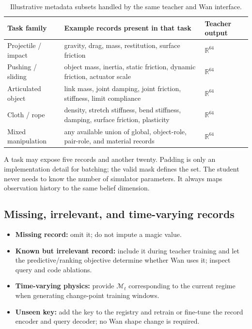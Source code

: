 \documentclass[11pt]{article}
\newcommand{\R}{\mathbb R}
\newcommand{\meta}{\mathcal M}
\begin{document}
\begin{table}[H]
\centering
\small
\caption{Illustrative metadata subsets handled by the same teacher and Wan interface.}
\begin{tabularx}{\textwidth}{L{0.18\textwidth} Y L{0.22\textwidth}}
\toprule
Task family & Example records present in that task & Teacher output \\
\midrule
Projectile / impact & gravity, drag, mass, restitution, surface friction & $\R^{64}$ \\
Pushing / sliding & object mass, inertia, static friction, dynamic friction, actuator scale & $\R^{64}$ \\
Articulated object & link mass, joint damping, joint friction, stiffness, limit compliance & $\R^{64}$ \\
Cloth / rope & density, stretch stiffness, bend stiffness, damping, surface friction, plasticity & $\R^{64}$ \\
Mixed manipulation & any available union of global, object-role, pair-role, and material records & $\R^{64}$ \\
\bottomrule
\end{tabularx}
\end{table}

A task may expose five records and another twenty.  Padding is only an
implementation detail for batching; the valid mask defines the set.  The
student never needs to know the number of simulator parameters.  It always
maps observation history to the same belief dimension.

\subsection{Missing, irrelevant, and time-varying records}

\begin{itemize}
  \item \textbf{Missing record:} omit it; do not impute a magic value.
  \item \textbf{Known but irrelevant record:} include it during teacher
  training and let the predictive/ranking objective determine whether Wan uses
  it; inspect query and code ablations.
  \item \textbf{Time-varying physics:} provide $\meta_t$ corresponding to the
  current regime when generating change-point training windows.
  \item \textbf{Unseen key:} add the key to the registry and retrain or
  fine-tune the record encoder and query decoder; no Wan shape change is
  required.
\end{itemize}
\end{document}
